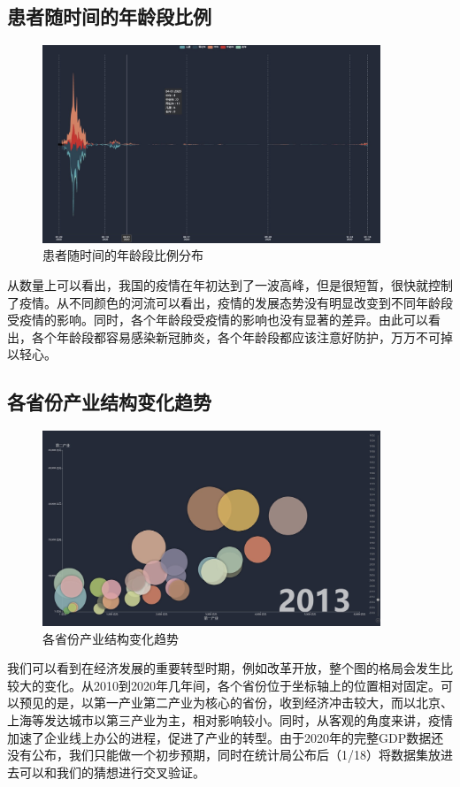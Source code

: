 \documentclass{ctexart}
\begin{document}
\subsection{患者随时间的年龄段比例}
\begin{figure}[H]
    \centering
    \includegraphics[width=0.9\textwidth]{img/age}
    \caption{患者随时间的年龄段比例分布}
    \label{}
\end{figure}
从数量上可以看出，我国的疫情在年初达到了一波高峰，但是很短暂，很快就控制了疫情。从不同颜色的河流可以看出，疫情的发展态势没有明显改变到不同年龄段受疫情的影响。同时，各个年龄段受疫情的影响也没有显著的差异。由此可以看出，各个年龄段都容易感染新冠肺炎，各个年龄段都应该注意好防护，万万不可掉以轻心。
\subsection{各省份产业结构变化趋势}
\begin{figure}[H]
    \centering
    \includegraphics[width=0.9\textwidth]{img/GDP}
    \caption{各省份产业结构变化趋势}
    \label{}
\end{figure}
我们可以看到在经济发展的重要转型时期，例如改革开放，整个图的格局会发生比较大的变化。从2010到2020年几年间，各个省份位于坐标轴上的位置相对固定。可以预见的是，以第一产业第二产业为核心的省份，收到经济冲击较大，而以北京、上海等发达城市以第三产业为主，相对影响较小。同时，从客观的角度来讲，疫情加速了企业线上办公的进程，促进了产业的转型。由于2020年的完整GDP数据还没有公布，我们只能做一个初步预期，同时在统计局公布后（1/18）将数据集放进去可以和我们的猜想进行交叉验证。
\end{document}

